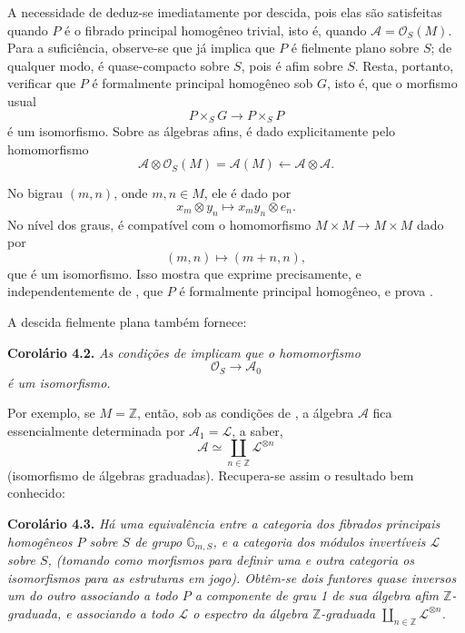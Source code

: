 A necessidade de 
deduz-se imediatamente por descida, pois elas são satisfeitas quando \(P\)
é o fibrado principal homogêneo trivial, isto é, quando
\(\mathscr A=\mathcal O_S(M)\). Para a suficiência, observe-se que
 já implica que \(P\)
é fielmente plano sobre \(S\); de qualquer modo, é quase-compacto sobre \(S\),
pois é afim sobre \(S\). Resta, portanto, verificar que \(P\) é
formalmente principal homogêneo sob \(G\), isto é, que o morfismo usual
\[
  P\times_SG\longrightarrow P\times_SP
\]
é um isomorfismo. Sobre as álgebras afins,
 é dado
explicitamente pelo homomorfismo
\[
  \mathscr A\otimes\mathcal O_S(M)=\mathscr A(M)
  \longleftarrow\mathscr A\otimes\mathscr A.
\]

No bigrau \((m,n)\), onde \(m,n\in M\), ele é dado por
\[
  x_m\otimes y_n\longmapsto x_my_n\otimes e_n.
\]
No nível dos graus,
 é
compatível com o homomorfismo \(M\times M\to M\times M\) dado por
\[
  (m,n)\longmapsto(m+n,n),
\]
que é um isomorfismo. Isso mostra que
 exprime precisamente,
e independentemente de
, que \(P\) é
formalmente principal homogêneo, e prova
.

A descida fielmente plana também fornece:

\medskip
\noindent{}\textbf{Corolário 4.2.}
\textit{As condições de 
implicam que o homomorfismo}
\[
  \mathcal O_S\longrightarrow\mathscr A_0
\]
\textit{é um isomorfismo.}

Por exemplo, se \(M=\mathbb Z\), então, sob as condições de
, a álgebra \(\mathscr A\) fica
essencialmente determinada por \(\mathscr A_1=\mathscr L\), a saber,
\[
  \mathscr A\simeq\coprod_{n\in\mathbb Z}\mathscr L^{\otimes n}
\]
(isomorfismo de álgebras graduadas). Recupera-se assim o resultado bem conhecido:

\medskip
\noindent{}\textbf{Corolário 4.3.}
\textit{Há uma equivalência entre a categoria dos
fibrados principais homogêneos \(P\) sobre \(S\) de
grupo \(\mathbb G_{m,S}\), e a categoria dos módulos
invertíveis \(\mathscr L\) sobre \(S\), (tomando como
morfismos para definir uma e outra categoria os
isomorfismos para as estruturas em jogo). Obtêm-se
dois funtores quase inversos um do outro associando a
todo \(P\) a componente de grau 1 de sua álgebra afim
\(\mathbb Z\)-graduada, e associando a todo \(\mathscr L\)
o espectro da álgebra \(\mathbb Z\)-graduada
\(\coprod_{n\in\mathbb Z}\mathscr L^{\otimes n}\).}

